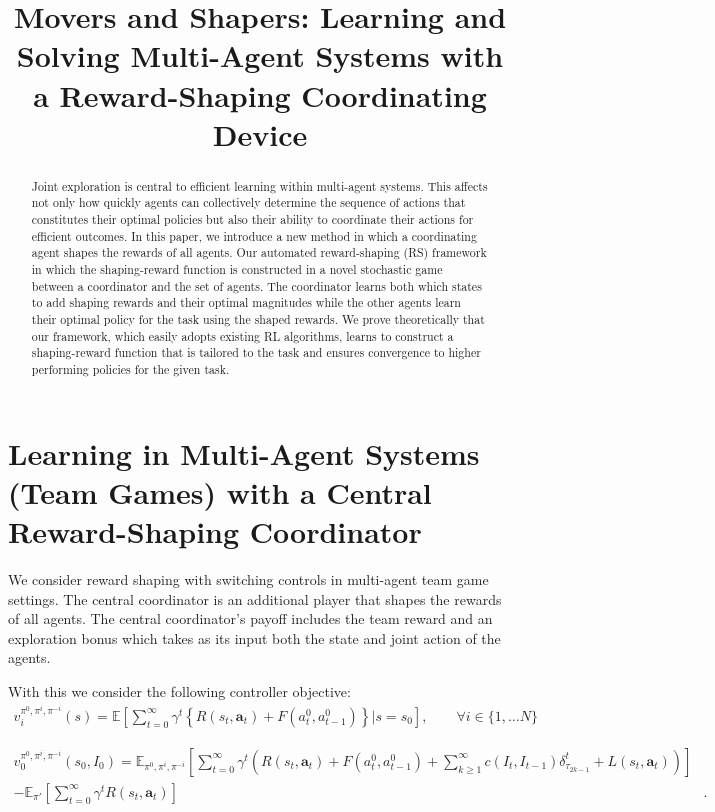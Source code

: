 \documentclass[12pt]{article}
\title{Movers and Shapers: Learning and Solving Multi-Agent Systems with a Reward-Shaping Coordinating Device}
\begin{document}
\date{}
\maketitle
\begin{abstract}
Joint exploration is central to efficient learning within multi-agent systems. This affects not only how quickly agents can collectively determine the sequence of actions that constitutes their optimal policies but also their ability to coordinate their actions for efficient outcomes. In this paper, we introduce a new method in which a coordinating agent shapes the rewards of all agents. Our automated reward-shaping (RS) framework in which the shaping-reward function is constructed in a novel stochastic game between a coordinator and the set of agents. The coordinator learns both which states to add shaping rewards and their optimal magnitudes while the other agents learn their optimal policy for the task using the shaped rewards. We prove theoretically that our framework, which easily adopts existing RL algorithms, learns to construct a shaping-reward function that is tailored to the task and ensures convergence to higher performing policies for the given task. 
\end{abstract}
\clearpage
\tableofcontents
\clearpage
\section{Learning in Multi-Agent Systems (Team Games) with a Central Reward-Shaping Coordinator}
We consider reward shaping with switching controls in multi-agent team game settings. The central coordinator is an additional player that shapes the rewards of all agents. The central coordinator's payoff includes the team reward and an exploration bonus which takes as its input both the state and joint action of the agents.

With this we consider the following controller objective: 
\begin{align}
v^{\pi^0,\pi^i,\pi^{-i}}_i(s)=\mathbb{E}\left[\sum_{t=0}^\infty \gamma^t\left\{R(s_t,\boldsymbol{a}_t)+F(a^0_t,a^0_{t-1})\right\}\Big|s=s_0\right], \qquad \forall i \in\{1,\ldots N\}\nonumber
\end{align}

\begin{align*}\nonumber
 v^{\pi^0,\pi^i,\pi^{-i}}_0(s_0,I_0)  = \mathbb{E}_{\pi^0,\pi^i,\pi^{-i}}\left[ \sum_{t=0}^\infty \gamma^t\left(R(s_t,\boldsymbol{a}_t)+F(a^0_t,a^0_{t-1}) +\sum_{k\geq 1}^\infty c(I_t,I_{t-1})\delta^t_{\tau_{2k-1}}
+L(s_t,\boldsymbol{a}_t)\right)\right]&
\\ -\mathbb{E}_{\pi'}\left[\sum_{t=0}^\infty \gamma^tR(s_t,\boldsymbol{a}_t)\right]&.
\end{align*}
\end{document}
